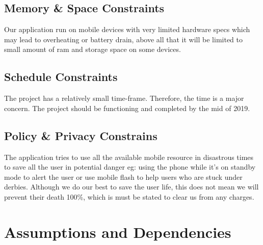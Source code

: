 \documentclass{scrreprt}
\begin{document}
\subsection{Memory \& Space Constraints}
Our application run on mobile devices with very limited hardware specs which may lead to overheating or battery drain, above all that it will be limited to small amount of ram and storage space on some devices. 

\subsection{Schedule Constraints}
The project has a relatively small time-frame. Therefore, the time is a major concern. The project should be functioning and completed by the mid of 2019.

\subsection{Policy \& Privacy Constrains}
The application tries to use all the available mobile resource in disastrous times to save all the user in potential danger eg: using the phone while it's on standby mode to alert the user or use mobile flash to help users who are stuck under derbies. Although we do our best to save the user life, this does not mean we will prevent their death 100\%, which is must be stated to clear us from any charges.


\section{Assumptions and Dependencies}

\end{document}
